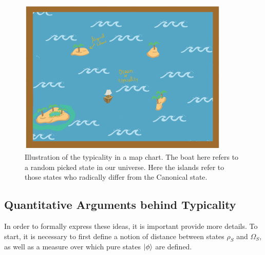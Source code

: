 \begin{figure}[h!]
\centering
\includegraphics[width=0.9\textwidth]{Figures/ocean-of-typicality.png}
\caption{Illustration of the typicality in a map chart. The boat here refers to a random picked state in our universe. Here the islands refer to those states who radically differ from the Canonical state.}
\end{figure}


\subsection{Quantitative Arguments behind Typicality}
In order to formally express these ideas, it is important provide more details. To start, it is necessary to first define a notion of distance between states $\rho_S$ and $\Omega_S$, as well as a measure over which pure states $\mathinner{|{\phi}\rangle}$ are defined.\\


